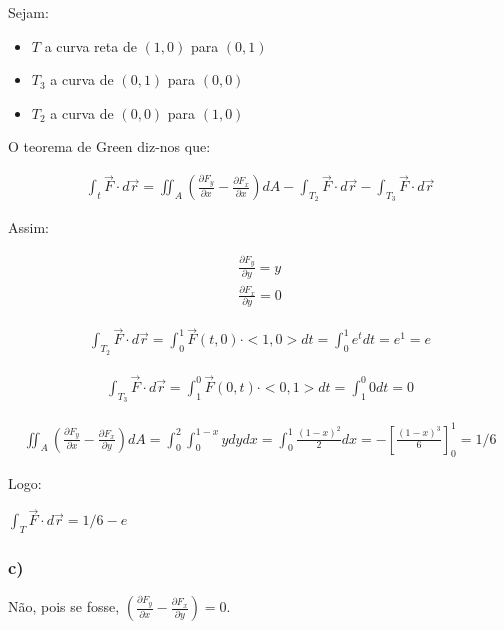 \documentclass{article}
\newcommand{\dr}[0]{d \vec{r}}
\newcommand{\vF}[0]{\vec{F}}
\newcommand{\sqrBrkts}[1]{\left[#1\right]}
\newcommand{\partialFrac}[2]{\frac{\partial #1}{\partial #2}}
\begin{document}
Sejam:
\begin{itemize}
\item $T$ a curva reta de $(1,0)$ para $(0,1)$
\item $T_3$ a curva de $(0,1)$ para $(0,0)$
\item $T_2$ a curva de $(0,0)$ para $(1,0)$
\end{itemize}

O teorema de Green diz-nos que:

\begin{gather*}
\int_t \vF \cdot \dr = \iint_A (\partialFrac{F_y}{x} - \partialFrac{F_x}{x}) dA - \int_{T_2} \vF \cdot \dr - \int_{T_3} \vF \cdot \dr
\end{gather*}

Assim:

\begin{gather*}
\partialFrac{F_y}{y} = y\\
\partialFrac{F_x}{y} = 0
\end{gather*}

\begin{gather*}
\int_{T_2} \vF \cdot \dr = \int_0^1 \vF (t, 0) \cdot <1,0> dt = \int_0^1 e^t dt = e^1 = e
\end{gather*}

\begin{gather*}
\int_{T_3} \vF \cdot \dr = \int_1^0 \vF (0, t) \cdot <0,1> dt = \int_1^0 0 dt = 0
\end{gather*}

\begin{gather*}
\iint_A (\partialFrac{F_y}{x} - \partialFrac{F_x}{y}) dA = \int_0^2 \int_0 ^{1-x} y dy dx = \int_0^1 \frac{(1-x)^2}{2} dx = -\sqrBrkts{\frac{(1-x)^3}{6}}_0^1 = 1/6
\end{gather*}

\vspace{5mm}

Logo:

\begin{center}
$\int_T \vF \cdot \dr = 1/6 - e$
\end{center}

\vspace{5mm}

\subsubsection*{c)}

Não, pois se fosse, $(\partialFrac{F_y}{x} - \partialFrac{F_x}{y}) = 0$.
\end{document}

